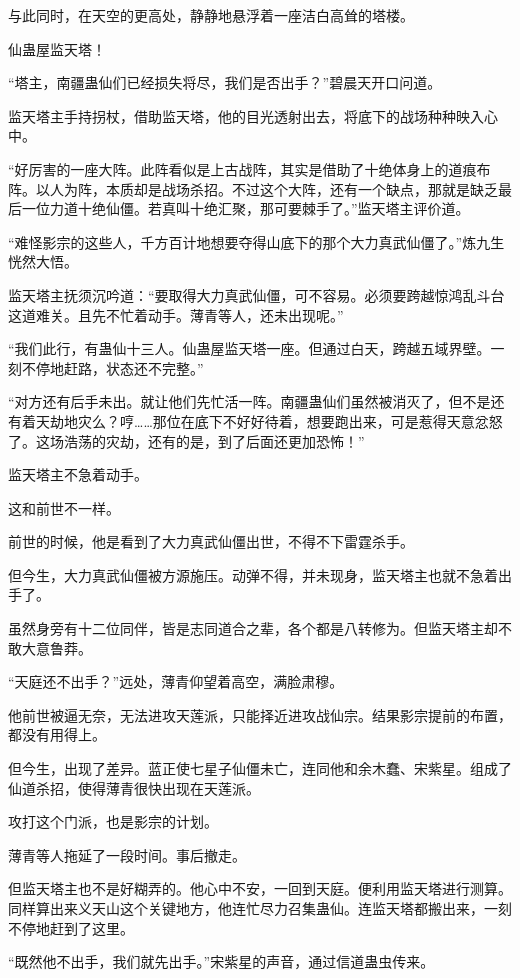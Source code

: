 \begin{this_body}
与此同时，在天空的更高处，静静地悬浮着一座洁白高耸的塔楼。

仙蛊屋监天塔！

“塔主，南疆蛊仙们已经损失将尽，我们是否出手？”碧晨天开口问道。

监天塔主手持拐杖，借助监天塔，他的目光透射出去，将底下的战场种种映入心中。

“好厉害的一座大阵。此阵看似是上古战阵，其实是借助了十绝体身上的道痕布阵。以人为阵，本质却是战场杀招。不过这个大阵，还有一个缺点，那就是缺乏最后一位力道十绝仙僵。若真叫十绝汇聚，那可要棘手了。”监天塔主评价道。

“难怪影宗的这些人，千方百计地想要夺得山底下的那个大力真武仙僵了。”炼九生恍然大悟。

监天塔主抚须沉吟道：“要取得大力真武仙僵，可不容易。必须要跨越惊鸿乱斗台这道难关。且先不忙着动手。薄青等人，还未出现呢。”

“我们此行，有蛊仙十三人。仙蛊屋监天塔一座。但通过白天，跨越五域界壁。一刻不停地赶路，状态还不完整。”

“对方还有后手未出。就让他们先忙活一阵。南疆蛊仙们虽然被消灭了，但不是还有着天劫地灾么？哼……那位在底下不好好待着，想要跑出来，可是惹得天意忿怒了。这场浩荡的灾劫，还有的是，到了后面还更加恐怖！”

监天塔主不急着动手。

这和前世不一样。

前世的时候，他是看到了大力真武仙僵出世，不得不下雷霆杀手。

但今生，大力真武仙僵被方源施压。动弹不得，并未现身，监天塔主也就不急着出手了。

虽然身旁有十二位同伴，皆是志同道合之辈，各个都是八转修为。但监天塔主却不敢大意鲁莽。

“天庭还不出手？”远处，薄青仰望着高空，满脸肃穆。

他前世被逼无奈，无法进攻天莲派，只能择近进攻战仙宗。结果影宗提前的布置，都没有用得上。

但今生，出现了差异。蓝正使七星子仙僵未亡，连同他和余木蠢、宋紫星。组成了仙道杀招，使得薄青很快出现在天莲派。

攻打这个门派，也是影宗的计划。

薄青等人拖延了一段时间。事后撤走。

但监天塔主也不是好糊弄的。他心中不安，一回到天庭。便利用监天塔进行测算。同样算出来义天山这个关键地方，他连忙尽力召集蛊仙。连监天塔都搬出来，一刻不停地赶到了这里。

“既然他不出手，我们就先出手。”宋紫星的声音，通过信道蛊虫传来。


\end{this_body}
